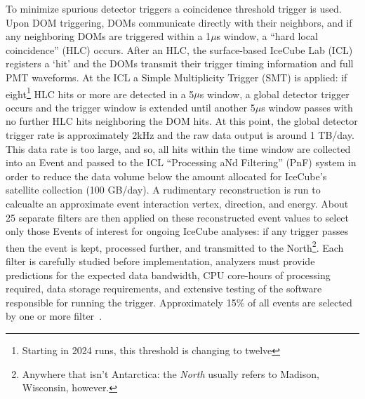 \documentclass[main.tex]{subfiles}
\begin{document}
To minimize spurious detector triggers a coincidence threshold trigger is used. 
Upon DOM triggering, DOMs communicate directly with their neighbors, and if any neighboring DOMs are triggered within a 1$\mu$s window, a ``hard local coincidence'' (HLC) occurs.
After an HLC, the surface-based IceCube Lab (ICL) registers a `hit' and the DOMs transmit their trigger timing information and full PMT waveforms.
At the ICL a Simple Multiplicity Trigger (SMT) is applied: if eight\footnote{Starting in 2024 runs, this threshold is changing to twelve} HLC hits or more are detected in a 5$\mu$s window, a global detector trigger occurs and the trigger window is extended until another 5$\mu$s window passes with no further HLC hits neighboring the DOM hits. 
At this point, the global detector trigger rate is approximately 2kHz and the raw data output is around 1 TB/day. 
This data rate is too large, and so, all hits within the time window are collected into an Event and passed to the ICL ``Processing aNd Filtering'' (PnF) system in order to reduce the data volume below the amount allocated for IceCube's satellite collection (100 GB/day). 
A rudimentary reconstruction is run to calcualte an approximate event interaction vertex, direction, and energy. 
About 25 separate filters are then applied on these reconstructed event values to select only those Events of interest for ongoing IceCube analyses: if any trigger passes then the event is kept, processed further, and transmitted to the North\footnote{Anywhere that isn't Antarctica: the \textit{North} usually refers to Madison, Wisconsin, however.}. 
Each filter is carefully studied before implementation, analyzers must provide predictions for the expected data bandwidth, CPU core-hours of processing required, data storage requirements, and extensive testing of the software responsible for running the trigger. 
Approximately 15\% of all events are selected by one or more filter~\cite{Aartsen_2017}. 
\end{document}
